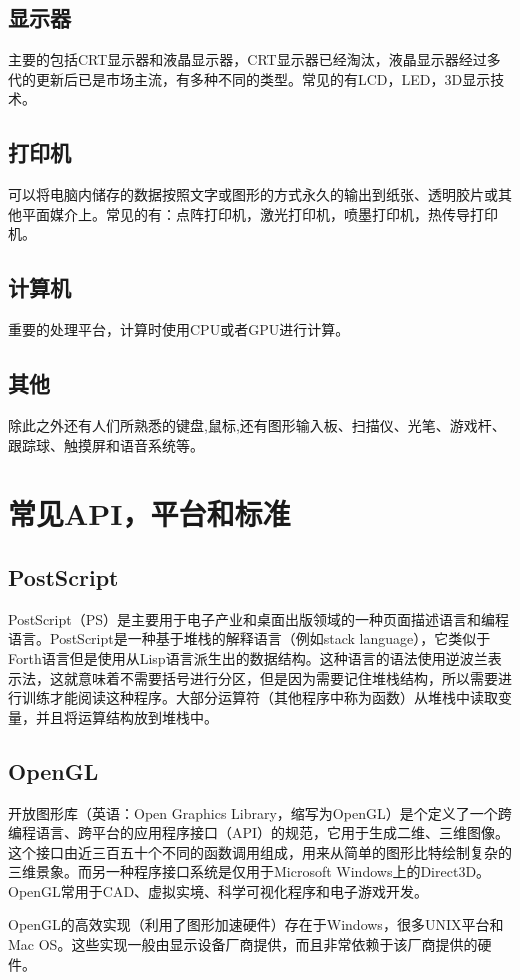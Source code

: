 \documentclass[UTF8]{article}
\begin{document}
\subsection{显示器}
主要的包括CRT显示器和液晶显示器，CRT显示器已经淘汰，液晶显示器经过多代的更新后已是市场主流，有多种不同的类型。常见的有LCD，LED，3D显示技术。
\subsection{打印机}
可以将电脑内储存的数据按照文字或图形的方式永久的输出到纸张、透明胶片或其他平面媒介上。常见的有：点阵打印机，激光打印机，喷墨打印机，热传导打印机。
\subsection{计算机}
重要的处理平台，计算时使用CPU或者GPU进行计算。
\subsection{其他}
除此之外还有人们所熟悉的键盘,鼠标,还有图形输入板、扫描仪、光笔、游戏杆、跟踪球、触摸屏和语音系统等。


\section{常见API，平台和标准}
\subsection{PostScript}
PostScript（PS）是主要用于电子产业和桌面出版领域的一种页面描述语言和编程语言。PostScript是一种基于堆栈的解释语言（例如stack language），它类似于Forth语言但是使用从Lisp语言派生出的数据结构。这种语言的语法使用逆波兰表示法，这就意味着不需要括号进行分区，但是因为需要记住堆栈结构，所以需要进行训练才能阅读这种程序。大部分运算符（其他程序中称为函数）从堆栈中读取变量，并且将运算结构放到堆栈中。
\subsection{OpenGL}
开放图形库（英语：Open Graphics Library，缩写为OpenGL）是个定义了一个跨编程语言、跨平台的应用程序接口（API）的规范，它用于生成二维、三维图像。这个接口由近三百五十个不同的函数调用组成，用来从简单的图形比特绘制复杂的三维景象。而另一种程序接口系统是仅用于Microsoft Windows上的Direct3D。OpenGL常用于CAD、虚拟实境、科学可视化程序和电子游戏开发。

OpenGL的高效实现（利用了图形加速硬件）存在于Windows，很多UNIX平台和Mac OS。这些实现一般由显示设备厂商提供，而且非常依赖于该厂商提供的硬件。
\end{document}
